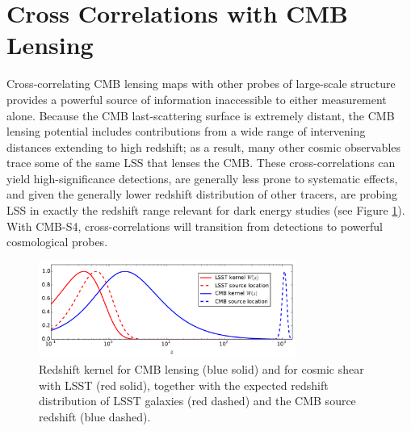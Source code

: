 






\section{Cross Correlations with CMB Lensing}\label{cross}

Cross-correlating CMB lensing maps with other probes of large-scale structure provides a powerful source of information inaccessible to either measurement alone.
Because the CMB last-scattering surface is extremely distant, 
the CMB lensing potential includes contributions from a wide range of 
intervening distances extending to high redshift; as a result, many other cosmic observables trace some of the same LSS that lenses the CMB.
These cross-correlations can yield high-significance detections, are generally less prone to systematic effects, and given the generally lower redshift distribution of other tracers, are probing LSS in exactly the redshift
range relevant for dark energy studies (see Figure \ref{cmb-gal-kernels}). 
With CMB-S4, cross-correlations will transition from detections to powerful cosmological probes. 

\begin{figure}[htbp]
\centering
\includegraphics[width=0.75\textwidth]{CMBLensing/CMB_effs.pdf}
\caption{Redshift kernel for CMB lensing (blue solid) and for cosmic shear with LSST (red solid), together with the expected redshift distribution of LSST galaxies (red dashed) and the CMB source redshift (blue dashed).}
\label{cmb-gal-kernels}
\end{figure}

